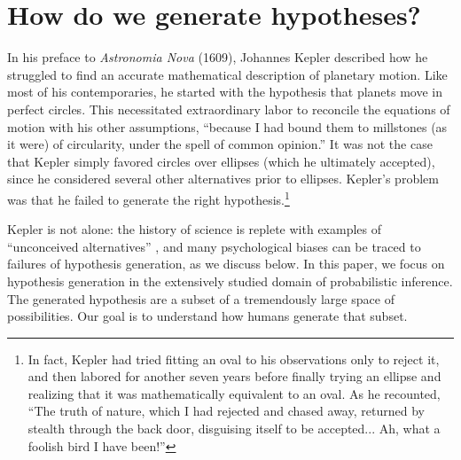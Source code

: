 \section{How do we generate hypotheses?}

In his preface to \emph{Astronomia Nova} (1609), Johannes Kepler described how he struggled to find an accurate mathematical description of planetary motion. Like most of his contemporaries, he started with the hypothesis that planets move in perfect circles. This necessitated extraordinary labor to reconcile the equations of motion with his other assumptions, ``because I had bound them to millstones (as it were) of circularity, under the spell of common opinion.'' It was not the case that Kepler simply favored circles over ellipses (which he ultimately accepted), since he considered several other alternatives prior to ellipses. Kepler's problem was that he failed to generate the right hypothesis.\footnote{In fact, Kepler had tried fitting an oval to his observations only to reject it, and then labored for another seven years before finally trying an ellipse and realizing that it was mathematically equivalent to an oval. As he recounted, ``The truth of nature, which I had rejected and chased away, returned by stealth through the back door, disguising itself to be accepted... Ah, what a foolish bird I have been!''} 

Kepler is not alone: the history of science is replete with examples of ``unconceived alternatives'' \citep{stanford10}, and many psychological biases can be traced to failures of hypothesis generation, as we discuss below. In this paper, we focus on hypothesis generation in the extensively studied domain of probabilistic inference. The generated hypothesis are a subset of a tremendously large space of possibilities. Our goal is to understand how humans generate that subset.

